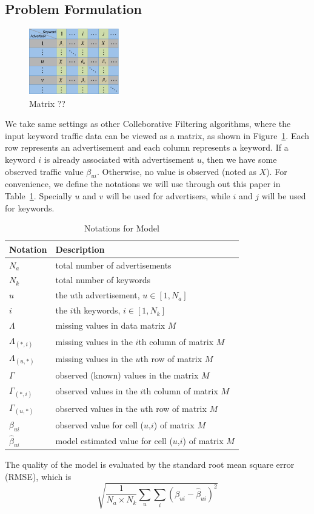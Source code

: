 \subsection{Problem Formulation}
\label{sec:problem}

\begin{figure}[!ht]
  \centering
  \includegraphics[width=0.35\textwidth]{figures/matrix.pdf}
  \caption{Matrix ??}
  \label{fig:problem-as-matrix}
\end{figure}
We take same settings as other Colleborative Filtering algorithms,
where the input keyword traffic data can be viewed as a matrix, as
shown in Figure~\ref{fig:problem-as-matrix}. Each row represents an
advertisement and each column represents a keyword. If a keyword $i$
is already associated with advertisement $u$, then we have some
observed traffic value $\beta_{ui}$. Otherwise, no value is observed
(noted as $X$). For convenience, we define the notations we will use
through out this paper in Table~\ref{tab:notations}. Specially $u$ and
$v$ will be used for advertisers, while $i$ and $j$ will be used for
keywords.

\begin{table}[!ht]
  \centering
  \begin{tabular}{|l|l|}
    \hline
    Notation & Description \\ \hline
    $N_a$ & total number of advertisements \\ \hline
    $N_k$ & total number of keywords \\ \hline
    $u$ & the $u$th advertisement, $u\in [1,N_a]$\\ \hline
    $i$ & the $i$th keywords, $i\in [1,N_k]$\\ \hline
    $\Lambda$ & missing values in data matrix $M$\\ \hline
    $\Lambda_{(*,i)}$  & missing values in the $i$th column of matrix $M$\\ \hline
    $\Lambda_{(u,*)}$ & missing values in the $u$th row of matrix $M$\\ \hline
    $\Gamma$ & observed (known) values in the matrix $M$\\ \hline
    $\Gamma_{(*,i)}$ & observed values in the $i$th column of matrix $M$\\ \hline
    $\Gamma_{(u,*)}$& observed values in the $u$th row of matrix $M$\\     \hline
    $\beta_{ui}$& observed value for cell ($u$,$i$) of matrix $M$\\ \hline
    $\hat{\beta}_{ui}$& model estimated value for cell ($u$,$i$) of matrix $M$\\ \hline
  \end{tabular}
  \caption{Notations for {\sppan} Model}
\label{tab:notations}
\end{table}

The quality of the model is evaluated by the standard root mean square
error (RMSE), which is
\[
\sqrt{\frac{1}{N_a \times N_k}\sum_u \sum_i \left(\beta_{ui}-\hat{\beta}_{ui}\right)^2}
\]
